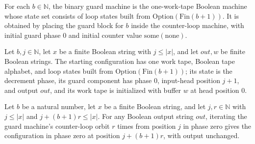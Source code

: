 \begin{definition}
\label{Turing.MachineFormat.binaryGuardTM}
\leanok
{}
For each $b\in\mathbb{N}$, the binary guard machine is the one-work-tape Boolean machine
whose state set consists of loop states built from $\mathrm{Option}(\mathrm{Fin}(b+1))$.
It is obtained by placing the guard block for $b$ inside the counter-loop machine, with
initial guard phase $0$ and initial counter value $\mathrm{some}(\mathrm{none})$.
\end{definition}

\begin{definition}
\label{Turing.MachineFormat.binaryGuardStart}
\leanok
{}
Let $b,j\in\mathbb{N}$, let $x$ be a finite Boolean string with $j\leq |x|$, and let
$out,w$ be finite Boolean strings. The starting configuration has one work tape, Boolean
tape alphabet, and loop states built from $\mathrm{Option}(\mathrm{Fin}(b+1))$; its
state is the decrement phase, its guard component has phase $0$, input-head position
$j+1$, and output $out$, and its work tape is initialized with buffer $w$ at head
position $0$.
\end{definition}

\begin{lemma}
\label{Turing.MachineFormat.guardBlock_orbit}
\leanok
{}
Let $b$ be a natural number, let $x$ be a finite Boolean string, and let $j,r\in\mathbb
N$ with $j\le |x|$ and $j+(b+1)r\le |x|$. For any Boolean output string $out$, iterating
the guard machine's counter-loop orbit $r$ times from position $j$ in phase zero gives
the configuration in phase zero at position $j+(b+1)r$, with output unchanged.
\end{lemma}

